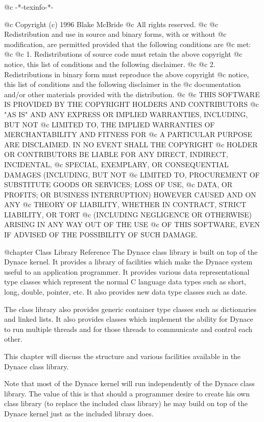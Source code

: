 @c -*-texinfo-*-

@c  Copyright (c) 1996 Blake McBride
@c  All rights reserved.
@c
@c  Redistribution and use in source and binary forms, with or without
@c  modification, are permitted provided that the following conditions are
@c  met:
@c
@c  1. Redistributions of source code must retain the above copyright
@c  notice, this list of conditions and the following disclaimer.
@c
@c  2. Redistributions in binary form must reproduce the above copyright
@c  notice, this list of conditions and the following disclaimer in the
@c  documentation and/or other materials provided with the distribution.
@c
@c  THIS SOFTWARE IS PROVIDED BY THE COPYRIGHT HOLDERS AND CONTRIBUTORS
@c  "AS IS" AND ANY EXPRESS OR IMPLIED WARRANTIES, INCLUDING, BUT NOT
@c  LIMITED TO, THE IMPLIED WARRANTIES OF MERCHANTABILITY AND FITNESS FOR
@c  A PARTICULAR PURPOSE ARE DISCLAIMED. IN NO EVENT SHALL THE COPYRIGHT
@c  HOLDER OR CONTRIBUTORS BE LIABLE FOR ANY DIRECT, INDIRECT, INCIDENTAL,
@c  SPECIAL, EXEMPLARY, OR CONSEQUENTIAL DAMAGES (INCLUDING, BUT NOT
@c  LIMITED TO, PROCUREMENT OF SUBSTITUTE GOODS OR SERVICES; LOSS OF USE,
@c  DATA, OR PROFITS; OR BUSINESS INTERRUPTION) HOWEVER CAUSED AND ON ANY
@c  THEORY OF LIABILITY, WHETHER IN CONTRACT, STRICT LIABILITY, OR TORT
@c  (INCLUDING NEGLIGENCE OR OTHERWISE) ARISING IN ANY WAY OUT OF THE USE
@c  OF THIS SOFTWARE, EVEN IF ADVISED OF THE POSSIBILITY OF SUCH DAMAGE.

@chapter Class Library Reference
The Dynace class library is built on top of the Dynace kernel.  It
provides a library of facilities which make the Dynace system useful to
an application programmer.  It provides various data representational
type classes which represent the normal C language data types such as
short, long, double, pointer, etc.  It also provides new data type
classes such as date.

The class library also provides generic container type classes such as
dictionaries and linked lists.  It also provides classes which implement
the ability for Dynace to run multiple threads and for those threads to
communicate and control each other.

This chapter will discuss the structure and various facilities available in
the Dynace class library.

Note that most of the Dynace kernel will run independently of the Dynace class
library.  The value of this is that should a programmer desire to create
his own class library (to replace the included class library) he may
build on top of the Dynace kernel just as the included library does.

